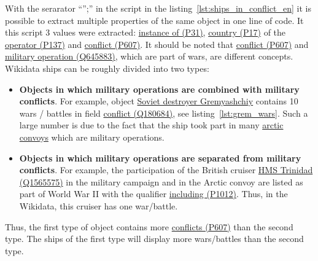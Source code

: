 With the serarator ``'';'' in the script in the listing~\ref{lst:ships_in_conflict_en} it is possible to extract multiple properties of the same object in one line of code. It this script 3 values were extracted: \href{https://www.wikidata.org/wiki/Property:P31}{instance of (P31)}, \href{https://www.wikidata.org/wiki/Property:P17}{country (P17)} of the \href{https://www.wikidata.org/wiki/Property:P137}{operator (P137)} and \href{https://www.wikidata.org/wiki/Property:P607}{conflict (P607)}. It should be noted that \href{https://www.wikidata.org/wiki/Property:P607}{conflict (P607)} and \href{https://www.wikidata.org/wiki/Q645883}{military operation (Q645883)}, which are part of wars, are different concepts. Wikidata ships can be roughly divided into two types:

\begin{itemize}
  \item \textbf{Objects in which military operations are combined with military conflicts}. For example, object \href{https://www.wikidata.org/wiki/Q4148613}{Soviet destroyer Gremyashchiy} contains 10 wars / battles in field \href{https://www.wikidata.org/wiki/Q180684}{conflict (Q180684)}, see listing~\ref{lst:grem_wars}. Such a large number is due to the fact that the ship took part in many \href{https://en.wikipedia.org/wiki/Arctic_convoys_of_World_War_II}{arctic convoys} which are military operations.
  
  \item \textbf{Objects in which military operations are separated from military conflicts}. For example, the participation of the British cruiser \href{https://www.wikidata.org/wiki/Q1565575}{HMS Trinidad (Q1565575)} in the military campaign and in the Arctic convoy are listed as part of World War II with the qualifier \href{https://www.wikidata.org/wiki/Property:P1012}{including (P1012)}. Thus, in the Wikidata, this cruiser has one war/battle.
\end{itemize}

Thus, the first type of object contains more \href{https://www.wikidata.org/wiki/Property:P607}{conflicts (P607)} than the second type. The ships of the first type will display more wars/battles than the second type. 

